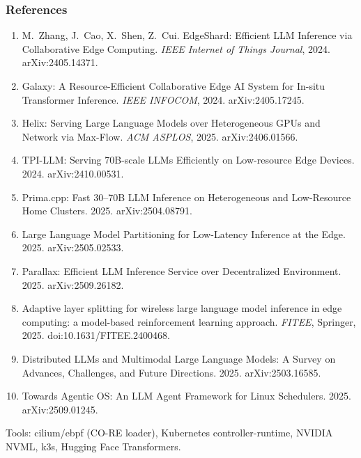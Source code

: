 \documentclass[aspectratio=169,11pt]{beamer}
\begin{document}
\begin{frame}
  \frametitle{References}
  \vspace{0.3em}
  {\scriptsize
  \begin{enumerate}\itemsep0.22em
    \item M.~Zhang, J.~Cao, X.~Shen, Z.~Cui. EdgeShard: Efficient LLM Inference
      via Collaborative Edge Computing. \emph{IEEE Internet of Things Journal},
      2024. arXiv:2405.14371.
    \item Galaxy: A Resource-Efficient Collaborative Edge AI System for In-situ
      Transformer Inference. \emph{IEEE INFOCOM}, 2024. arXiv:2405.17245.
    \item Helix: Serving Large Language Models over Heterogeneous GPUs and
      Network via Max-Flow. \emph{ACM ASPLOS}, 2025. arXiv:2406.01566.
    \item TPI-LLM: Serving 70B-scale LLMs Efficiently on Low-resource Edge
      Devices. 2024. arXiv:2410.00531.
    \item Prima.cpp: Fast 30--70B LLM Inference on Heterogeneous and
      Low-Resource Home Clusters. 2025. arXiv:2504.08791.
    \item Large Language Model Partitioning for Low-Latency Inference at the
      Edge. 2025. arXiv:2505.02533.
    \item Parallax: Efficient LLM Inference Service over Decentralized
      Environment. 2025. arXiv:2509.26182.
    \item Adaptive layer splitting for wireless large language model inference
      in edge computing: a model-based reinforcement learning approach.
      \emph{FITEE}, Springer, 2025. doi:10.1631/FITEE.2400468.
    \item Distributed LLMs and Multimodal Large Language Models: A Survey on
      Advances, Challenges, and Future Directions. 2025. arXiv:2503.16585.
    \item Towards Agentic OS: An LLM Agent Framework for Linux Schedulers.
      2025. arXiv:2509.01245.
  \end{enumerate}}
  \vfill
  {\scriptsize Tools: cilium/ebpf (CO-RE loader), Kubernetes controller-runtime,
   NVIDIA NVML, k3s, Hugging Face Transformers.}
\end{frame}
\end{document}
